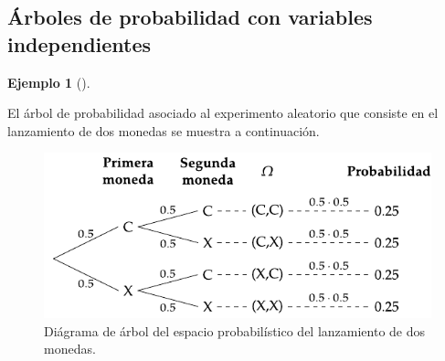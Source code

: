 \documentclass[
  a4paper,
]{scrreport}
\theoremstyle{plain}
\theoremstyle{definition}
\newtheorem{example}{Ejemplo}[chapter]
\theoremstyle{definition}
\theoremstyle{remark}
\begin{document}
\subsection{Árboles de probabilidad con variables
independientes}\label{uxe1rboles-de-probabilidad-con-variables-independientes}

\begin{example}[]\protect\hypertarget{exm-arbol-probabilidad-variables-independientes}{}\label{exm-arbol-probabilidad-variables-independientes}

El árbol de probabilidad asociado al experimento aleatorio que consiste
en el lanzamiento de dos monedas se muestra a continuación.

\begin{figure}[H]

{\centering \includegraphics{img/probabilidad/espacio_probabilistico_monedas.pdf}

}

\caption{Diágrama de árbol del espacio probabilístico del lanzamiento de
dos monedas.}

\end{figure}%

\end{example}
\end{document}
